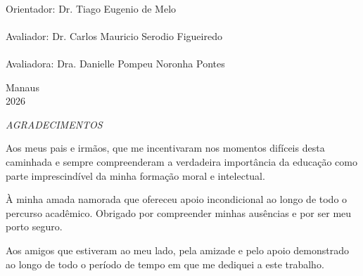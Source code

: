 \documentclass[12pt, a4paper]{article}
\numberwithin{equation}{section}
\begin{document}
\begin{minipage}[l]{14cm}
\begin{center}
\hspace{1cm}\uline{\hspace{10.5cm}} \\
\hspace{1cm}Orientador: Dr. Tiago Eugenio de Melo
\\[1.5cm]  %
\hspace{1cm}\uline{\hspace{10.5cm}} \\
\hspace{1cm}Avaliador: Dr. Carlos Mauricio Serodio Figueiredo 
\\[1.5cm]  %
\hspace{1cm}\uline{\hspace{10.5cm}} \\
\hspace{1cm}Avaliadora: Dra. Danielle Pompeu Noronha Pontes
\\
\end{center}
\end{minipage}
\vspace*{\fill}
\begin{center}
Manaus\\2026
\end{center}


\newpage
\thispagestyle{empty}
{\begin{center}\textit{\normalsize AGRADECIMENTOS}\vspace{36pt}\end{center}}

Aos meus pais e irmãos, que me incentivaram nos momentos difíceis desta caminhada e sempre compreenderam a verdadeira importância da educação como parte imprescindível da minha formação moral e intelectual.

À minha amada namorada que ofereceu apoio incondicional ao longo de todo o percurso acadêmico. Obrigado por compreender minhas ausências e por ser meu porto seguro.

Aos amigos que estiveram ao meu lado, pela amizade e pelo apoio demonstrado ao longo de todo o período de tempo em que me dediquei a este trabalho.
\end{document}

